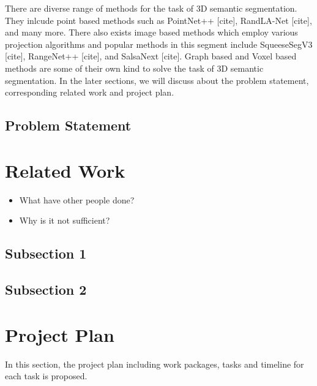 \documentclass[thesis]{mas_proposal}
\begin{document}
There are diverse range of methods for the task of 3D semantic segmentation. 
They inlcude point based methods such as PointNet++ [cite], RandLA-Net [cite], and many more.
There also exists image based methods which employ various projection algorithms and popular methods in this segment include SqueeseSegV3 [cite], RangeNet++ [cite], and SalsaNext [cite].
Graph based and Voxel based methods are some of their own kind to solve the task of 3D semantic segmentation.
In the later sections, we will discuss about the problem statement, corresponding related work and project plan.


\subsection{Problem Statement}


\section{Related Work}
\begin{itemize}
    \item What have other people done?
    \item Why is it not sufficient?
\end{itemize}

\subsection{Subsection 1}
\subsection{Subsection 2}



\section{Project Plan}
In this section, the project plan including work packages, tasks and timeline for each task is proposed.
\end{document}
